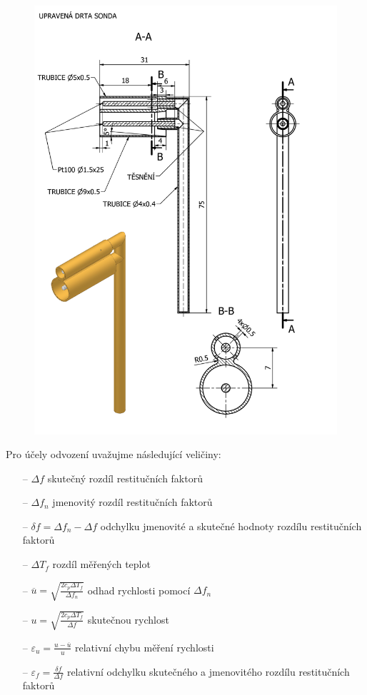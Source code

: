     \begin{figure}[ht!]
        \centering
        \includegraphics[width=\textwidth]{500_FINAL/sonda_final_vykres.png}
    \end{figure}

 \label{sec:odvozeni-chyby}
    Pro účely odvození uvažujme následující veličiny:
    \begin{itemize}
        \item[–] $\Delta f$ skutečný rozdíl restitučních faktorů
        \item[–] $\Delta f_n$ jmenovitý rozdíl restitučních faktorů
        \item[–] $\delta f = \Delta f_n - \Delta f$ odchylku jmenovité a skutečné hodnoty rozdílu restitučních faktorů
        \item[–] $\Delta T_f$ rozdíl měřených teplot
        \item[–] $\overline{u} = \sqrt{\frac{2 c_p \Delta T_f}{\Delta f_n}}$ odhad rychlosti pomocí $\Delta f_n$
        \item[–] $u = \sqrt{\frac{2 c_p \Delta T_f}{\Delta f}}$ skutečnou rychlost
        \item[–] $\varepsilon _u = \frac{u - \overline{u}}{u}$ relativní chybu měření rychlosti
        \item[–] $\varepsilon _f = \frac{\delta f}{\Delta f}$ relativní odchylku skutečného a jmenovitého rozdílu restitučních faktorů
    \end{itemize}

